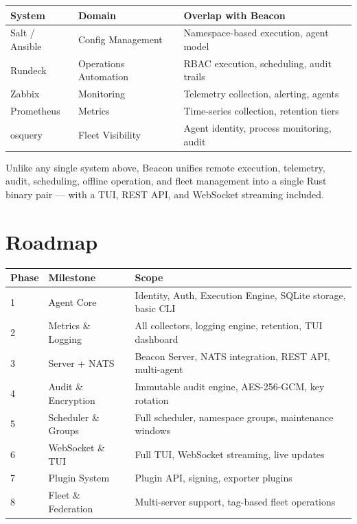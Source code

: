 \documentclass[12pt,a4paper]{article}
\begin{document}
\begin{center}
\begin{tabularx}{\textwidth}{llX}
\toprule
System & Domain & Overlap with Beacon \\
\midrule
Salt / Ansible  & Config Management    & Namespace-based execution, agent model \\
Rundeck         & Operations Automation & RBAC execution, scheduling, audit trails \\
Zabbix          & Monitoring           & Telemetry collection, alerting, agents \\
Prometheus      & Metrics              & Time-series collection, retention tiers \\
osquery         & Fleet Visibility     & Agent identity, process monitoring, audit \\
\bottomrule
\end{tabularx}
\end{center}

Unlike any single system above, Beacon unifies remote execution, telemetry, audit, scheduling, offline operation, and fleet management into a single Rust binary pair — with a TUI, REST API, and WebSocket streaming included.

\section{Roadmap}

\begin{center}
\begin{tabularx}{\textwidth}{llX}
\toprule
Phase & Milestone & Scope \\
\midrule
1 & Agent Core          & Identity, Auth, Execution Engine, SQLite storage, basic CLI \\
2 & Metrics \& Logging  & All collectors, logging engine, retention, TUI dashboard \\
3 & Server + NATS       & Beacon Server, NATS integration, REST API, multi-agent \\
4 & Audit \& Encryption & Immutable audit engine, AES-256-GCM, key rotation \\
5 & Scheduler \& Groups & Full scheduler, namespace groups, maintenance windows \\
6 & WebSocket \& TUI    & Full TUI, WebSocket streaming, live updates \\
7 & Plugin System       & Plugin API, signing, exporter plugins \\
8 & Fleet \& Federation & Multi-server support, tag-based fleet operations \\
\bottomrule
\end{tabularx}
\end{center}
\end{document}
